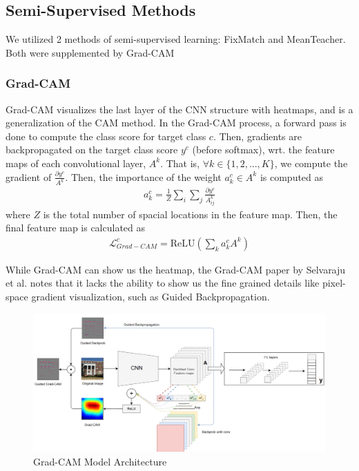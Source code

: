 \documentclass{article}
\begin{document}
\subsection{Semi-Supervised Methods}

We utilized 2 methods of semi-supervised learning: FixMatch and MeanTeacher. Both were supplemented by Grad-CAM

\subsubsection{Grad-CAM}

Grad-CAM visualizes the last layer of the CNN structure with heatmaps, and is a generalization of the CAM method. In the Grad-CAM process, a forward pass is done to compute the class score for target class $c$. Then, gradients are backpropagated on the target class score $y^c$ (before softmax), wrt. the feature maps of each convolutional layer, $A^k$. That is, $\forall k \in \{1, 2, ..., K\}$, we compute the gradient of $\frac{\partial y^c}{A^k}$. Then, the importance of the weight $a_k^c\in A^k$ is computed as \begin{align*}
    a_k^c=\frac{1}{Z}\sum_i\sum_j\frac{\partial y^c}{A_{ij}^k}
\end{align*} where $Z$ is the total number of spacial locations in the feature map. Then, the final feature map is calculated as \begin{align*}
    \mathcal{L}_{Grad-CAM}^c=\text{ReLU}\left(\sum_k a_k^cA^k\right)
\end{align*}

While Grad-CAM can show us the heatmap, the Grad-CAM paper by Selvaraju et al. \cite{selvaraju} notes that it lacks the ability to show us the fine grained details like pixel-space gradient visualization, such as Guided Backpropagation. 


\begin{figure}[H]
    \centering
    \includegraphics[width=0.8\linewidth]{model_architecture.png}
    \caption{Grad-CAM Model Architecture}
    \label{fig:gradcam_architecture}
\end{figure}
\end{document}
